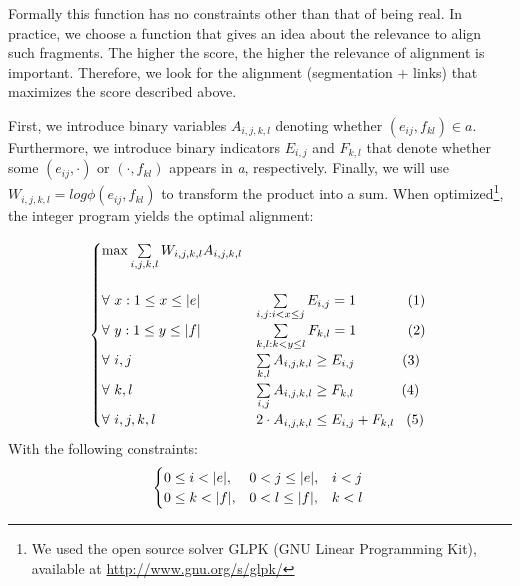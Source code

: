 \documentclass[output=paper,modfonts,nonflat]{langsci/langscibook}
\begin{document}
Formally this function has no constraints other than that of being real. 
In practice, we choose a function that gives an idea about the relevance to align such fragments. 
The higher the score, the higher the relevance of alignment is important. 
Therefore, we look for the alignment (segmentation + links) that maximizes the score described above.

First, we introduce binary variables $A_{i,j,k,l}$ denoting whether $(e_{ij},f_{kl}) \in a$.
Furthermore, we introduce binary indicators $E_{i,j}$ and $F_{k,l}$ that denote whether some $(e_{ij} ,  \cdotp)$ or $( \cdotp, f_{kl})$ appears in \textit{a}, respectively. 
Finally, we will use $W_{i,j,k,l} = log \phi(e_{ij},f_{kl})$ to transform the product into a sum.
When optimized\footnote{We used the open source solver GLPK (GNU Linear Programming Kit), available at \url{http://www.gnu.org/s/glpk/}}, the integer program yields the optimal alignment:

\begin{equation}
	\begin{cases}
	    \max \sum\limits_{i,j,k,l}{W_{i,j,k,l}A_{i,j,k,l}}\\
	    \\
	    \forall~x: 1\leq x\leq |e| & \sum\limits_{i,j: i<x\leq j}{E_{i,j}} = 1 \hspace{1.3cm}(1)\\
	    \forall~y: 1\leq y\leq |f| & \sum\limits_{k,l: k<y\leq l}{F_{k,l}} = 1 \hspace{1.3cm}(2)\\
	    \forall~i,j & \sum\limits_{k,l}{A_{i,j,k,l}} \geq E_{i,j} \hspace{1.2cm}(3)\\
	    \forall~k,l & \sum\limits_{i,j}{A_{i,j,k,l}} \geq F_{k,l} \hspace{1.2cm}(4)\\
	    \forall~i,j,k,l & 2\cdot A_{i,j,k,l} \leq E_{i,j}+F_{k,l} \hspace{0.3cm}(5)\\
	\end{cases}\\
\end{equation}
	With the following constraints:
\begin{equation}
	\begin{cases}
	0 \leq i < |e|, & 0 < j \leq |e|, \hspace{0.3cm} i < j\\
	0 \leq k < |f|, & 0 < l \leq |f|, \hspace{0.3cm} k < l\\ 
	\end{cases}\\
\end{equation}
\end{document}
